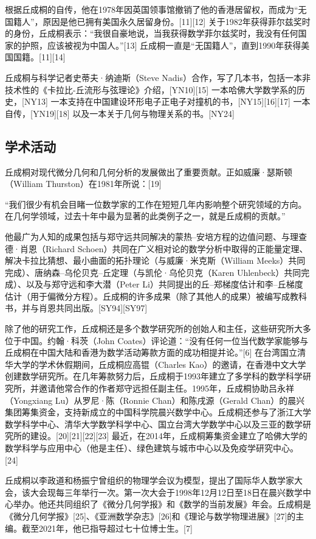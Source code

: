根据丘成桐的自传，他在1978年因英国领事馆撤销了他的香港居留权，而成为“无国籍人”，原因是他已拥有美国永久居留身份。[11][12] 关于1982年获得菲尔兹奖时的身份，丘成桐表示：“我很自豪地说，当我获得数学菲尔兹奖时，我没有任何国家的护照，应该被视为中国人。”[13] 丘成桐一直是“无国籍人”，直到1990年获得美国国籍。[11][14]

丘成桐与科学记者史蒂夫·纳迪斯（Steve Nadis）合作，写了几本书，包括一本非技术性的《卡拉比-丘流形与弦理论》介绍，[YN10][15] 一本哈佛大学数学系的历史，[NY13] 一本支持在中国建设环形电子正电子对撞机的书，[NY15][16][17] 一本自传，[YN19][18] 以及一本关于几何与物理关系的书。[NY24]
\subsection{学术活动}  
丘成桐对现代微分几何和几何分析的发展做出了重要贡献。正如威廉·瑟斯顿（William Thurston）在1981年所说：[19]

“我们很少有机会目睹一位数学家的工作在短短几年内影响整个研究领域的方向。在几何学领域，过去十年中最为显著的此类例子之一，就是丘成桐的贡献。”

他最广为人知的成果包括与郑守远共同解决的蒙热–安培方程的边值问题、与理查德·肖恩（Richard Schoen）共同在广义相对论的数学分析中取得的正能量定理、解决卡拉比猜想、最小曲面的拓扑理论（与威廉·米克斯（William Meeks）共同完成）、唐纳森–乌伦贝克–丘定理（与凯伦·乌伦贝克（Karen Uhlenbeck）共同完成）、以及与郑守远和李大潜（Peter Li）共同提出的丘–郑梯度估计和李–丘梯度估计（用于偏微分方程）。丘成桐的许多成果（除了其他人的成果）被编写成教科书，并与肖恩共同出版。[SY94][SY97]

除了他的研究工作，丘成桐还是多个数学研究所的创始人和主任，这些研究所大多位于中国。约翰·科茨（John Coates）评论道：“没有任何一位当代数学家能够与丘成桐在中国大陆和香港为数学活动筹款方面的成功相提并论。”[6] 在台湾国立清华大学的学术休假期间，丘成桐应高锟（Charles Kao）的邀请，在香港中文大学创建数学研究所。在几年筹款努力后，丘成桐于1993年建立了多学科的数学科学研究所，并邀请他常合作的作者郑守远担任副主任。1995年，丘成桐协助吕永祥（Yongxiang Lu）从罗尼·陈（Ronnie Chan）和陈戌源（Gerald Chan）的晨兴集团筹集资金，支持新成立的中国科学院晨兴数学中心。丘成桐还参与了浙江大学数学科学中心、清华大学数学科学中心、国立台湾大学数学中心以及三亚的数学研究所的建设。[20][21][22][23] 最近，在2014年，丘成桐筹集资金建立了哈佛大学的数学科学与应用中心（他是主任）、绿色建筑与城市中心以及免疫学研究中心。[24]

丘成桐以李政道和杨振宁曾组织的物理学会议为模型，提出了国际华人数学家大会，该大会现每三年举行一次。第一次大会于1998年12月12日至18日在晨兴数学中心举办。他还共同组织了《微分几何学报》和《数学的当前发展》年会。丘成桐是《微分几何学报》[25]、《亚洲数学杂志》[26]和《理论与数学物理进展》[27]的主编。截至2021年，他已指导超过七十位博士生。[7]

